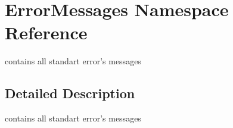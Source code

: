 \hypertarget{namespaceErrorMessages}{
\section{ErrorMessages Namespace Reference}
\label{namespaceErrorMessages}
}


contains all standart error's messages  




\subsection{Detailed Description}
contains all standart error's messages 